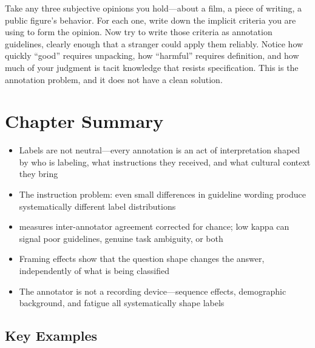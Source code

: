 
\begin{trythis}
Take any three subjective opinions you hold---about a film, a piece of writing, a public figure's behavior. For each one, write down the implicit criteria you are using to form the opinion. Now try to write those criteria as annotation guidelines, clearly enough that a stranger could apply them reliably. Notice how quickly ``good'' requires unpacking, how ``harmful'' requires definition, and how much of your judgment is tacit knowledge that resists specification. This is the annotation problem, and it does not have a clean solution.
\end{trythis}

\section*{Chapter Summary}

\begin{keyconcept}
\begin{itemize}
    \item Labels are not neutral---every annotation is an act of interpretation shaped by who is labeling, what instructions they received, and what cultural context they bring
    \item The instruction problem: even small differences in guideline wording produce systematically different label distributions
    \item {} measures inter-annotator agreement corrected for chance; low kappa can signal poor guidelines, genuine task ambiguity, or both
    \item Framing effects show that the question shape changes the answer, independently of what is being classified
    \item The annotator is not a recording device---sequence effects, demographic background, and fatigue all systematically shape labels
\end{itemize}
\end{keyconcept}

\subsection*{Key Examples}


